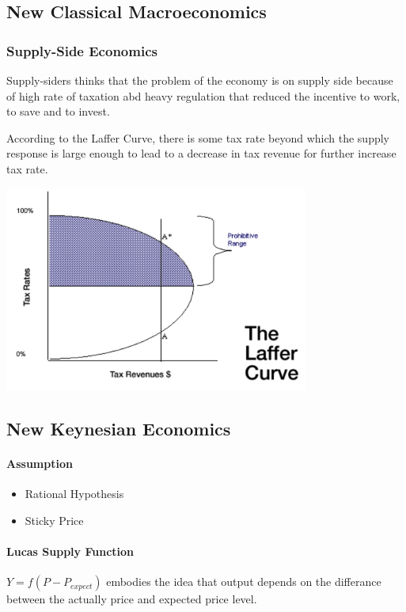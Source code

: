 \documentclass[11pt]{article}
\begin{document}
\subsection{New Classical Macroeconomics}
\subsubsection{Supply-Side Economics}
Supply-siders thinks that the problem of the economy is on supply side because of high rate of taxation abd heavy regulation that reduced the incentive to work, to save and to invest.

According to the Laffer Curve, there is some tax rate beyond which the supply response is large enough to lead to a decrease in tax revenue for further increase tax rate.

\includegraphics[width=10cm]{Laffer.png}

\subsection{New Keynesian Economics}
\paragraph{Assumption}
\begin{itemize}
    \item Rational Hypothesis
    \item Sticky Price
\end{itemize}

\paragraph{Lucas Supply Function}
$Y = f(P - P_{expect})$ embodies the idea that output depends on the differance between the actually price and expected price level.
\end{document}

